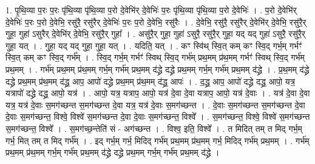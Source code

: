 \documentclass[17pt]{extarticle}
\begin{document}
1. पृ॒थि॒व्या प॒रः प॒रः पृ॑थि॒व्या पृ॑थि॒व्या प॒रो दे॒वेभि॑र् दे॒वेभिः॑ प॒रः पृ॑थि॒व्या पृ॑थि॒व्या प॒रो दे॒वेभिः॑ । . प॒रो दे॒वेभि॑र् दे॒वेभिः॑ प॒रः प॒रो दे॒वेभि॒ रसु॑रै॒ रसु॑रैर् दे॒वेभिः॑ प॒रः प॒रो दे॒वेभि॒ रसु॑रैः । . दे॒वेभि॒ रसु॑रै॒ रसु॑रैर् दे॒वेभि॑र् दे॒वेभि॒ रसु॑रै॒र् गुहा॒ गुहा॑ ऽसुरैर् दे॒वेभि॑र् दे॒वेभि॒ रसु॑रै॒र् गुहा᳚ । . असु॑रै॒र् गुहा॒ गुहा॑ ऽसुरै॒ रसु॑रै॒र् गुहा॒ यद् यद् गुहा॑ ऽसुरै॒ रसु॑रै॒र् गुहा॒ यत् । . गुहा॒ यद् यद् गुहा॒ गुहा॒ यत् । . यदिति॒ यत् । . कꣳ स्वि॑थ् स्वि॒त् कम् कꣳ स्वि॒द् गर्भ॒म् गर्भꣳ॑ स्वि॒त् कम् कꣳ स्वि॒द् गर्भ᳚म् । . स्वि॒द् गर्भ॒म् गर्भꣳ॑ स्विथ् स्वि॒द् गर्भ॑म् प्रथ॒मम् प्र॑थ॒मम् गर्भꣳ॑ स्विथ् स्वि॒द् गर्भ॑म् प्रथ॒मम् । . गर्भ॑म् प्रथ॒मम् प्र॑थ॒मम् गर्भ॒म् गर्भ॑म् प्रथ॒मम् द॑द्ध्रे दद्ध्रे प्रथ॒मम् गर्भ॒म् गर्भ॑म् प्रथ॒मम् द॑द्ध्रे । . प्र॒थ॒मम् द॑द्ध्रे दद्ध्रे प्रथ॒मम् प्र॑थ॒मम् द॑द्ध्र॒ आप॒ आपो॑ दद्ध्रे प्रथ॒मम् प्र॑थ॒मम् द॑द्ध्र॒ आपः॑ । . द॒द्ध्र॒ आप॒ आपो॑ दद्ध्रे दद्ध्र॒ आपो॒ यत्र॒ यत्रापो॑ दद्ध्रे दद्ध्र॒ आपो॒ यत्र॑ । . आपो॒ यत्र॒ यत्राप॒ आपो॒ यत्र॑ दे॒वा दे॒वा यत्राप॒ आपो॒ यत्र॑ दे॒वाः । . यत्र॑ दे॒वा दे॒वा यत्र॒ यत्र॑ दे॒वाः स॒मग॑च्छन्त स॒मग॑च्छन्त दे॒वा यत्र॒ यत्र॑ दे॒वाः स॒मग॑च्छन्त । . दे॒वाः स॒मग॑च्छन्त स॒मग॑च्छन्त दे॒वा दे॒वाः स॒मग॑च्छन्त॒ विश्वे॒ विश्वे॑ स॒मग॑च्छन्त दे॒वा दे॒वाः स॒मग॑च्छन्त॒ विश्वे᳚ । . स॒मग॑च्छन्त॒ विश्वे॒ विश्वे॑ स॒मग॑च्छन्त स॒मग॑च्छन्त॒ विश्वे᳚ । . स॒मग॑च्छ॒न्तेति॑ सं - अग॑च्छन्त । . विश्व॒ इति॒ विश्वे᳚ । . त मिदित् तम् त मिद् गर्भ॒म् गर्भ॒ मित् तम् त मिद् गर्भ᳚म् । . इद् गर्भ॒म् गर्भ॒ मिदिद् गर्भ॑म् प्रथ॒मम् प्र॑थ॒मम् गर्भ॒ मिदिद् गर्भ॑म् प्रथ॒मम् । . गर्भ॑म् प्रथ॒मम् प्र॑थ॒मम् गर्भ॒म् गर्भ॑म् प्रथ॒मम् द॑द्ध्रे दद्ध्रे प्रथ॒मम् गर्भ॒म् गर्भ॑म् प्रथ॒मम् द॑द्ध्रे । \newline
\end{document}
